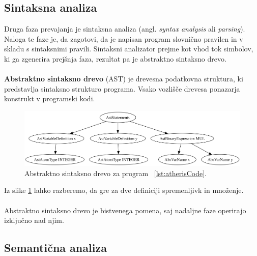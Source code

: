 \documentclass[a4paper, 12p]{book}
\begin{document}
\subsection{Sintaksna analiza}

Druga faza prevajanja je sintaksna analiza (angl. \textit{syntax analysis} ali \textit{parsing}). Naloga te faze je, da zagotovi, da je napisan program slovnično pravilen in v skladu s sintaksnimi pravili. Sintaksni analizator prejme kot vhod tok simbolov, ki ga zgenerira prejšnja faza, rezultat pa je abstraktno sintaksno drevo. \\\\
\indent\textbf{Abstraktno sintaksno drevo} (AST) je drevesna podatkovna struktura, ki predstavlja sintaksno strukturo programa. Vsako vozlišče drevesa ponazarja konstrukt v programski kodi.\\

\begin{figure}[h]
	\begin{center}
		\includegraphics[width=1\textwidth]{resources/ast.png}
	\end{center}
	\caption{Abstraktno sintaksno drevo za program ~\ref{lst:atherisCode}.}
	\label{image:abstractSyntaxTree}
\end{figure}

Iz slike \ref{image:abstractSyntaxTree} lahko razberemo, da gre za dve definiciji spremenljivk in množenje.\\\\
\indent Abstraktno sintaksno drevo je bistvenega pomena, saj nadaljne faze operirajo izključno nad njim.

\subsection{Semantična analiza}
\end{document}
